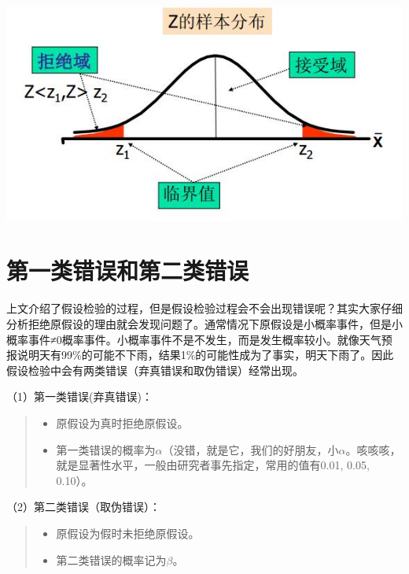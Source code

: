 \documentclass[]{ctexbook}
\providecommand{\tightlist}{%
  \setlength{\itemsep}{0pt}\setlength{\parskip}{0pt}}
\begin{document}
\includegraphics[width=1\linewidth,height=0.35\textheight]{fig/fig12}

\hypertarget{ux7b2cux4e00ux7c7bux9519ux8befux548cux7b2cux4e8cux7c7bux9519ux8bef}{%
\section{第一类错误和第二类错误}\label{ux7b2cux4e00ux7c7bux9519ux8befux548cux7b2cux4e8cux7c7bux9519ux8bef}}

上文介绍了假设检验的过程，但是假设检验过程会不会出现错误呢？其实大家仔细分析拒绝原假设的理由就会发现问题了。通常情况下原假设是小概率事件，但是小概率事件≠0概率事件。小概率事件不是不发生，而是发生概率较小。就像天气预报说明天有99\%的可能不下雨，结果1\%的可能性成为了事实，明天下雨了。因此假设检验中会有两类错误（弃真错误和取伪错误）经常出现。

（1）第一类错误(弃真错误)：

\begin{quote}
\begin{itemize}
\tightlist
\item
  原假设为真时拒绝原假设。
\item
  第一类错误的概率为\(\alpha\)（没错，就是它，我们的好朋友，小\(\alpha\)。咳咳咳，就是显著性水平，一般由研究者事先指定，常用的值有0.01, 0.05, 0.10）。
\end{itemize}
\end{quote}

（2）第二类错误（取伪错误）：

\begin{quote}
\begin{itemize}
\tightlist
\item
  原假设为假时未拒绝原假设。
\item
  第二类错误的概率记为\(\beta\)。
\end{itemize}
\end{quote}
\end{document}
